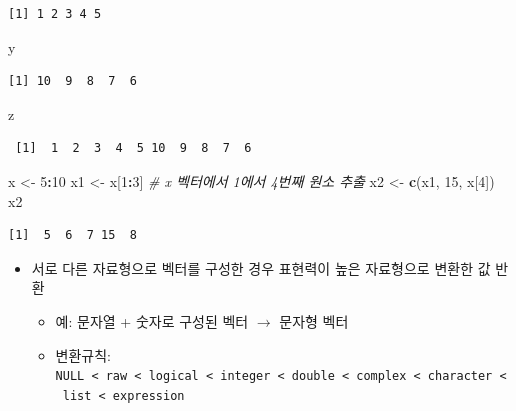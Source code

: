 \documentclass[
  11pt,
]{krantz}
\newenvironment{Shaded}{\begin{snugshade}}{\end{snugshade}}
\newcommand{\CommentTok}[1]{\textcolor[rgb]{0.37,0.37,0.37}{\textit{#1}}}
\newcommand{\DecValTok}[1]{\textcolor[rgb]{0.06,0.06,0.06}{#1}}
\newcommand{\KeywordTok}[1]{\textcolor[rgb]{0.27,0.27,0.27}{\textbf{#1}}}
\newcommand{\NormalTok}[1]{#1}
\newcommand{\OperatorTok}[1]{\textcolor[rgb]{0.43,0.43,0.43}{\textbf{#1}}}
\newcommand{\StringTok}[1]{\textcolor[rgb]{0.5,0.5,0.5}{#1}}
\providecommand{\tightlist}{%
  \setlength{\itemsep}{0pt}\setlength{\parskip}{0pt}}
\begin{document}
\begin{verbatim}
[1] 1 2 3 4 5
\end{verbatim}

\begin{Shaded}
\begin{Highlighting}[]
\NormalTok{y}
\end{Highlighting}
\end{Shaded}

\begin{verbatim}
[1] 10  9  8  7  6
\end{verbatim}

\begin{Shaded}
\begin{Highlighting}[]
\NormalTok{z}
\end{Highlighting}
\end{Shaded}

\begin{verbatim}
 [1]  1  2  3  4  5 10  9  8  7  6
\end{verbatim}

\begin{Shaded}
\begin{Highlighting}[]
\NormalTok{x <-}\StringTok{ }\DecValTok{5}\OperatorTok{:}\DecValTok{10}
\NormalTok{x1 <-}\StringTok{ }\NormalTok{x[}\DecValTok{1}\OperatorTok{:}\DecValTok{3}\NormalTok{] }\CommentTok{# x 벡터에서 1에서 4번째 원소 추출}
\NormalTok{x2 <-}\StringTok{ }\KeywordTok{c}\NormalTok{(x1, }\DecValTok{15}\NormalTok{, x[}\DecValTok{4}\NormalTok{])}
\NormalTok{x2}
\end{Highlighting}
\end{Shaded}

\begin{verbatim}
[1]  5  6  7 15  8
\end{verbatim}

\normalsize

\begin{itemize}
\tightlist
\item
  서로 다른 자료형으로 벡터를 구성한 경우 표현력이 높은 자료형으로 변환한 값 반환

  \begin{itemize}
  \tightlist
  \item
    예: 문자열 + 숫자로 구성된 벡터 \(\rightarrow\) 문자형 벡터
  \item
    변환규칙: \texttt{NULL\ \textless{}\ raw\ \textless{}\ logical\ \textless{}\ integer\ \textless{}\ double\ \textless{}\ complex\ \textless{}\ character\ \textless{}\ list\ \textless{}\ expression}
  \end{itemize}
\end{itemize}
\end{document}
